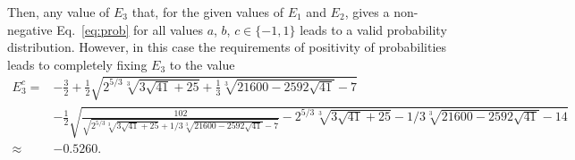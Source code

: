 \documentclass[aps,physrev,reprint,superscriptaddress,nofootinbib,twocolumn]{revtex4-2}
\begin{document}
Then, any value of $E_3$ that, for the given values of $E_1$ and $E_2$, gives a non-negative Eq.~\eqref{eq:prob} for all values $a$, $b$, $c\in\{-1,1\}$ leads to a valid probability distribution.
However, in this case the requirements of positivity of probabilities leads to completely fixing $E_3$ to the value
\begin{equation*}
    \begin{aligned}
        E_3^c= &-\frac{3}{2} + \frac{1}{2}\sqrt{2^{5/3}\sqrt[3]{3\sqrt{41} + 25} + \frac {1} {3}\sqrt[3]{21600 - 2592\sqrt{41}} - 7} \\
        &- \frac {1} {2}\sqrt {\frac{102}{\sqrt{2^{5/3}\sqrt[3]{3\sqrt{41} + 25} + 1/3\sqrt[3]{21600 - 2592\sqrt{41}} - 7}} - 2^{5/3}\sqrt[3] {3\sqrt {41} + 25} - 1/3\sqrt[3]{21600 - 2592\sqrt{41}} - 14}\\
        \approx&-0.5260.
    \end{aligned}
\end{equation*}
\end{document}
